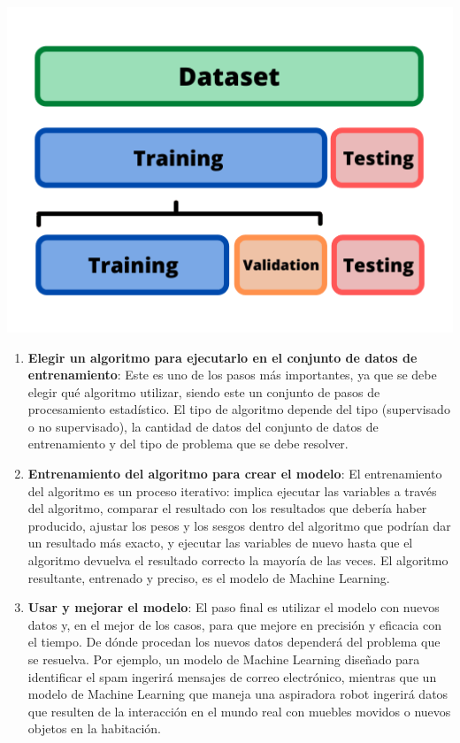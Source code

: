 \documentclass[
]{book}
\begin{document}
\begin{center}\includegraphics[width=600pt]{img/01-repaso/train-and-test} \end{center}

\begin{enumerate}
\def\labelenumi{\arabic{enumi}.}
\setcounter{enumi}{1}
\item
  \textbf{Elegir un algoritmo para ejecutarlo en el conjunto de datos de entrenamiento}:
  Este es uno de los pasos más importantes, ya que se debe elegir qué algoritmo utilizar, siendo este un conjunto de pasos de procesamiento estadístico. El tipo de algoritmo depende del tipo (supervisado o no supervisado), la cantidad de datos del conjunto de datos de entrenamiento y del tipo de problema que se debe resolver.
\item
  \textbf{Entrenamiento del algoritmo para crear el modelo}:
  El entrenamiento del algoritmo es un proceso iterativo: implica ejecutar las variables a través del algoritmo, comparar el resultado con los resultados que debería haber producido, ajustar los pesos y los sesgos dentro del algoritmo que podrían dar un resultado más exacto, y ejecutar las variables de nuevo hasta que el algoritmo devuelva el resultado correcto la mayoría de las veces. El algoritmo resultante, entrenado y preciso, es el modelo de Machine Learning.
\item
  \textbf{Usar y mejorar el modelo}:
  El paso final es utilizar el modelo con nuevos datos y, en el mejor de los casos, para que mejore en precisión y eficacia con el tiempo. De dónde procedan los nuevos datos dependerá del problema que se resuelva. Por ejemplo, un modelo de Machine Learning diseñado para identificar el spam ingerirá mensajes de correo electrónico, mientras que un modelo de Machine Learning que maneja una aspiradora robot ingerirá datos que resulten de la interacción en el mundo real con muebles movidos o nuevos objetos en la habitación.
\end{enumerate}
\end{document}
